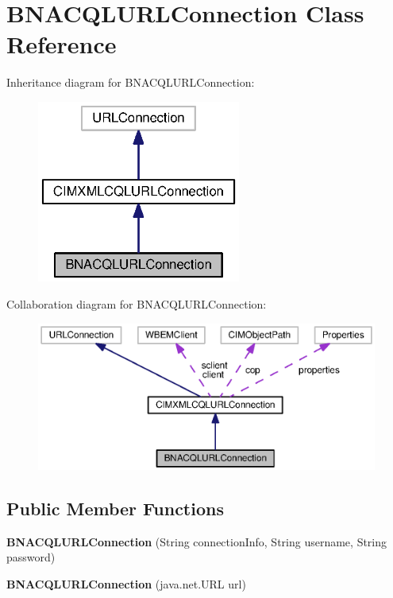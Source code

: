 \section{B\+N\+A\+C\+Q\+L\+U\+R\+L\+Connection Class Reference}
\label{classorg_1_1smallfoot_1_1parser_1_1bnacql_1_1BNACQLURLConnection}


Inheritance diagram for B\+N\+A\+C\+Q\+L\+U\+R\+L\+Connection\+:\nopagebreak
\begin{figure}[H]
\begin{center}
\leavevmode
\includegraphics[width=190pt]{classorg_1_1smallfoot_1_1parser_1_1bnacql_1_1BNACQLURLConnection__inherit__graph}
\end{center}
\end{figure}


Collaboration diagram for B\+N\+A\+C\+Q\+L\+U\+R\+L\+Connection\+:
\nopagebreak
\begin{figure}[H]
\begin{center}
\leavevmode
\includegraphics[width=350pt]{classorg_1_1smallfoot_1_1parser_1_1bnacql_1_1BNACQLURLConnection__coll__graph}
\end{center}
\end{figure}
\subsection*{Public Member Functions}
\begin{DoxyCompactItemize}
\item 
{\bf B\+N\+A\+C\+Q\+L\+U\+R\+L\+Connection} (String connection\+Info, String username, String password)
\item 
{\bf B\+N\+A\+C\+Q\+L\+U\+R\+L\+Connection} (java.\+net.\+U\+R\+L url)
\end{DoxyCompactItemize}
